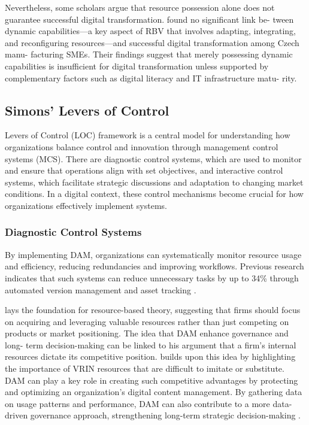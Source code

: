 \documentclass[a4paper,12pt,twocolumn]{article}
\begin{document}
\vspace{0.3cm}
Nevertheless, some scholars argue that resource possession alone does not guarantee successful digital transformation. 
\cite{Civelek2023} found no significant link be-
tween dynamic capabilities—a key aspect
of RBV that involves adapting, integrating,
and reconfiguring resources—and successful
digital transformation among Czech manu-
facturing SMEs. Their findings suggest that
merely possessing dynamic capabilities is
insufficient for digital transformation unless
supported by complementary factors such as
digital literacy and IT infrastructure matu-
rity.

\subsection{Simons’ Levers of Control}
\cite{simons1995} Levers of Control (LOC) framework is a central model for understanding how organizations 
balance control and innovation through management control systems (MCS). 
There are diagnostic control systems, which are used to monitor and ensure that operations 
align with set objectives, and interactive control systems, which facilitate strategic discussions and adaptation to 
changing market conditions. In a digital context, these control mechanisms become crucial for how organizations effectively 
implement systems.

\subsubsection{Diagnostic Control Systems}
By implementing DAM, organizations can systematically monitor resource usage and efficiency, reducing redundancies 
and improving workflows. Previous research indicates that such systems can reduce unnecessary tasks by up to 34\% through automated version management 
and asset tracking \cite{Mladenova2024}. 

\vspace{0.3cm}
\cite{wernerfelt1984} lays the foundation for resource-based theory, suggesting that firms should focus on acquiring and leveraging valuable resources 
rather than just competing on products or market positioning. The idea that DAM enhance governance and long-
term decision-making can be linked to his argument that a firm’s internal resources
dictate its competitive position. \cite{barney1991} builds upon this idea by highlighting the importance of VRIN resources that are difficult to imitate or substitute. 
DAM can play a key role in creating such competitive advantages by protecting and optimizing an organization’s digital content management. 
By gathering data on usage patterns and performance, DAM can also contribute to a more data-driven governance approach, strengthening long-term strategic decision-making \cite{wernerfelt1984}.
\end{document}
